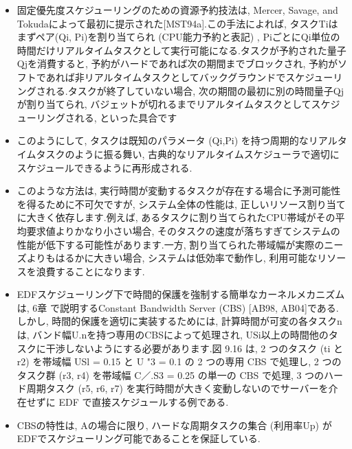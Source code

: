 \begin{frame}{}
\begin{itemize}
\item 固定優先度スケジューリングのための資源予約技法は, Mercer, Savage, and Tokudaによって最初に提示された[MST94a].この手法によれば, タスクTiはまずペア(Qi, Pi)を割り当てられ (CPU能力予約と表記) , PiごとにQi単位の時間だけリアルタイムタスクとして実行可能になる.タスクが予約された量子Qjを消費すると, 予約がハードであれば次の期間までブロックされ, 予約がソフトであれば非リアルタイムタスクとしてバックグラウンドでスケジューリングされる.タスクが終了していない場合, 次の期間の最初に別の時間量子Qjが割り当てられ, バジェットが切れるまでリアルタイムタスクとしてスケジューリングされる, といった具合です
\end{itemize}
\end{frame}

\begin{frame}{}
\begin{itemize}
\item このようにして, タスクは既知のパラメータ (Qi,Pi) を持つ周期的なリアルタイムタスクのように振る舞い, 古典的なリアルタイムスケジューラで適切にスケジュールできるように再形成される.
\end{itemize}
\end{frame}

\begin{frame}{}
\begin{itemize}
\item このような方法は, 実行時間が変動するタスクが存在する場合に予測可能性を得るために不可欠ですが, システム全体の性能は, 正しいリソース割り当てに大きく依存します.例えば, あるタスクに割り当てられたCPU帯域がその平均要求値よりかなり小さい場合, そのタスクの速度が落ちすぎてシステムの性能が低下する可能性があります.一方, 割り当てられた帯域幅が実際のニーズよりもはるかに大きい場合, システムは低効率で動作し, 利用可能なリソースを浪費することになります.
\end{itemize}
\end{frame}

\begin{frame}{}
\begin{itemize}
\item EDFスケジューリング下で時間的保護を強制する簡単なカーネルメカニズムは, 6章 で説明するConstant Bandwidth Server (CBS) [AB98, AB04]である.しかし, 時間的保護を適切に実装するためには, 計算時間が可変の各タスクnは, バンド幅U.nを持つ専用のCBSによって処理され, USi以上の時間他のタスクに干渉しないようにする必要があります.図 9.16 は, 2 つのタスク (ti と r2) を帯域幅 USl = 0.15 と U "3 = 0.1 の 2 つの専用 CBS で処理し, 2 つのタスク群 (r3, r4) を帯域幅 C／.S3 = 0.25 の単一の CBS で処理, 3 つのハード周期タスク (r5, r6, r7) を実行時間が大きく変動しないのでサーバーを介在せずに EDF で直接スケジュールする例である.
\end{itemize}
\end{frame}

\begin{frame}{}
\end{frame}

\begin{frame}{}
\begin{itemize}
\item CBSの特性は, Aの場合に限り, ハードな周期タスクの集合 (利用率Up) がEDFでスケジューリング可能であることを保証している.
\end{itemize}
\end{frame}
